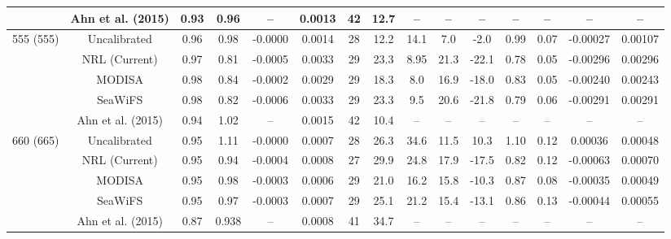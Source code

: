 \documentclass[preview]{standalone}
\begin{document}
\begin{tabular}{ccccccccccccccc}
 							& Ahn et al. (2015) & 0.93 & 0.96 & -- & 0.0013 & 42 & 12.7 & -- & -- & -- & -- & -- & -- & -- \\ \hline
\multirow{5}{*}{555 (555)} 	& Uncalibrated 	& 0.96 & 0.98 & -0.0000 & 0.0014 & 28 & 12.2 & 14.1 & 7.0 & -2.0 & 0.99 & 0.07 & -0.00027 & 0.00107 \\ 
							& NRL (Current)	& 0.97 & 0.81 & -0.0005 & 0.0033 & 29 & 23.3 & 8.95 & 21.3 & -22.1 & 0.78 & 0.05 & -0.00296 & 0.00296\\
 							& MODISA 		& 0.98 & 0.84 & -0.0002 & 0.0029 & 29 & 18.3 & 8.0 & 16.9 & -18.0 & 0.83 & 0.05 & -0.00240 & 0.00243 \\ 
 							& SeaWiFS 		& 0.98 & 0.82 & -0.0006 & 0.0033 & 29 & 23.3 & 9.5 & 20.6 & -21.8 & 0.79 & 0.06 & -0.00291 & 0.00291\\ 

 							& Ahn et al. (2015) & 0.94 & 1.02 & -- & 0.0015 & 42 & 10.4 & -- & -- & -- & -- & -- & -- & -- \\ \hline
\multirow{5}{*}{660 (665)} 	& Uncalibrated 	& 0.95 & 1.11 & -0.0000 & 0.0007 & 28 & 26.3 & 34.6 & 11.5 & 10.3 & 1.10 & 0.12 &  0.00036 & 0.00048 \\ 
							& NRL (Current)	& 0.95 & 0.94 & -0.0004 & 0.0008 & 27 & 29.9 & 24.8 & 17.9 & -17.5 & 0.82 &  0.12 & -0.00063 & 0.00070\\
 							& MODISA 		& 0.95 & 0.98 & -0.0003 & 0.0006 & 29 & 21.0 & 16.2 & 15.8 & -10.3 & 0.87 & 0.08& -0.00035 & 0.00049 \\ 
 							& SeaWiFS 		& 0.95 & 0.97 & -0.0003 & 0.0007 & 29 & 25.1 & 21.2 & 15.4 & -13.1 & 0.86 & 0.13 & -0.00044 & 0.00055\\ 

 							& Ahn et al. (2015) & 0.87 & 0.938 & -- & 0.0008 & 41 & 34.7 & -- & -- & -- & -- & -- & -- & -- \\ \hline
\end{tabular}
\end{document}

